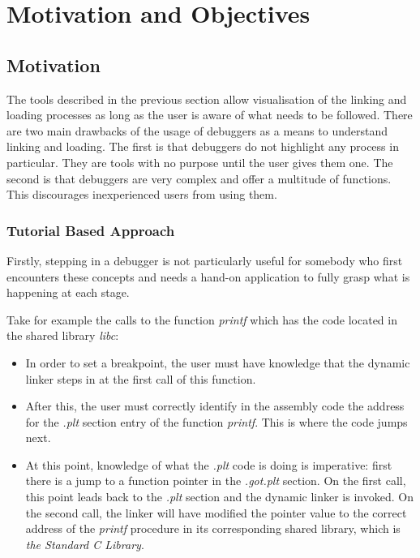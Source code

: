 \chapter{Motivation and Objectives}
\label{chapter:motiv_obj}

\section{Motivation}
\label{sec:motivation}

The tools described in the previous section allow visualisation of the linking and loading processes as long as the user is aware of what needs to be followed. There are two main drawbacks of the usage of debuggers as a means to understand linking and loading. The first is that debuggers do not highlight any process in particular. They are tools with no purpose until the user gives them one. The second is that debuggers are very complex and offer a multitude of functions. This discourages inexperienced users from using them.

\subsection{Tutorial Based Approach}
\label{sub-sec:tutorial-approach}

Firstly, stepping in a debugger is not particularly useful for somebody who first encounters these concepts and needs a hand-on application to fully grasp what is happening at each stage.

Take for example the calls to the function \textit{printf} which has the code located in the shared library \textit{libc}:
\begin{itemize}
\item In order to set a breakpoint, the user must have knowledge that the dynamic linker steps in at the first call of this function.
\item After this, the user must correctly identify in the assembly code the address for the \textit{.plt} section entry of the function \textit{printf}. This is where the code jumps next.
\item At this point, knowledge of what the \textit{.plt} code is doing is imperative: first there is a jump to a function pointer in the \textit{.got.plt} section. On the first call, this point leads back to the \textit{.plt} section and the dynamic linker is invoked. On the second call, the linker will have modified the pointer value to the correct address of the \textit{printf} procedure in its corresponding shared library, which is \textit{the Standard C Library}.
\end{itemize}

